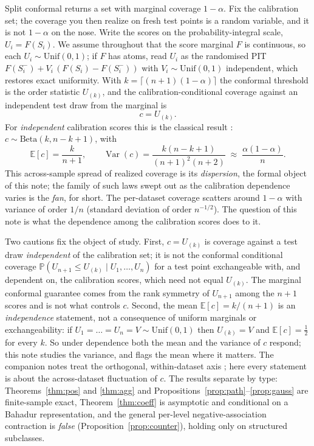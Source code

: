 \documentclass[11pt]{article}
\begin{document}
Split conformal returns a set with marginal coverage $1-\alpha$. Fix the calibration set; the
coverage you then realize on fresh test points is a random variable, and it is not $1-\alpha$ on the
nose. Write the scores on the probability-integral scale, $U_i=F(S_i)$. We assume throughout that the
score marginal $F$ is continuous, so each $U_i\sim\mathrm{Unif}(0,1)$; if $F$ has atoms, read $U_i$ as
the randomised PIT $F(S_i^-)+V_i\,(F(S_i)-F(S_i^-))$ with $V_i\sim\mathrm{Unif}(0,1)$ independent,
which restores exact uniformity. With $k=\lceil(n+1)(1-\alpha)\rceil$ the conformal threshold is the
order statistic $U_{(k)}$, and the calibration-conditional coverage against an independent test draw
from the marginal is
\begin{equation}
c=U_{(k)} .
\end{equation}
For \emph{independent} calibration scores this is the classical result \citep{vovk2012,marques2024}:
$c\sim\mathrm{Beta}(k,n-k+1)$, with
\begin{equation}\label{eq:betavar}
\mathbb E[c]=\frac{k}{n+1},\qquad \operatorname{Var}(c)=\frac{k(n-k+1)}{(n+1)^2(n+2)}\;\approx\;
\frac{\alpha(1-\alpha)}{n}.
\end{equation}
This across-sample spread of realized coverage is its \emph{dispersion}, the formal object of this
note; the family of such laws swept out as the calibration dependence varies is the \emph{fan}, for
short. The per-dataset coverage
scatters around $1-\alpha$ with variance of order $1/n$ (standard deviation of order $n^{-1/2}$). The
question of this note is what the dependence among the calibration scores does to it.

Two cautions fix the object of study. First, $c=U_{(k)}$ is coverage against a test draw
\emph{independent} of the calibration set; it is not the conformal conditional coverage
$\mathbb P(U_{n+1}\le U_{(k)}\mid U_1,\dots,U_n)$ for a test point exchangeable with, and dependent
on, the calibration scores, which need not equal $U_{(k)}$. The marginal conformal guarantee comes
from the rank symmetry of $U_{n+1}$ among the $n+1$ scores and is not what controls $c$. Second, the
mean $\mathbb E[c]=k/(n+1)$ is an \emph{independence} statement, not a consequence of uniform
marginals or exchangeability: if $U_1=\dots=U_n=V\sim\mathrm{Unif}(0,1)$ then $U_{(k)}=V$ and
$\mathbb E[c]=\tfrac12$ for every $k$. So under dependence both the mean and the variance of $c$
respond; this note studies the variance, and flags the mean where it matters. The companion notes
treat the orthogonal, within-dataset axis \citep{cotton_marginally,cotton_signed}; here every
statement is about the across-dataset fluctuation of $c$. The results separate by type:
Theorems~\ref{thm:pos} and \ref{thm:agg} and Propositions~\ref{prop:path}--\ref{prop:gauss} are
finite-sample exact, Theorem~\ref{thm:coeff} is asymptotic and conditional on a Bahadur
representation, and the general per-level negative-association contraction is \emph{false}
(Proposition~\ref{prop:counter}), holding only on structured subclasses.
\end{document}
